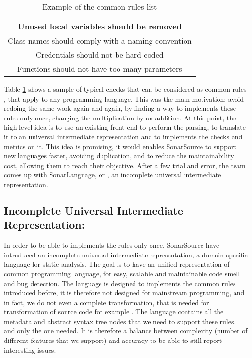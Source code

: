 \begin{table}[h]
\centering
\caption{Example of the common rules list}
\label{table:common_rules}
	\begin{tabular}{|c|}
		\hline
		Unused local variables should be removed  \\ \hline
		Class names should comply with a naming convention \\ \hline
		Credentials should not be hard-coded \\ \hline
		Functions should not have too many parameters \\ \hline
	\end{tabular}
\end{table}

Table \ref{table:common_rules} shows a sample of typical checks that can be considered as common rules \cite{JiraSonarSource:2019:Online} , that apply to any programming language.
This was the main motivation: avoid redoing the same work again and again, by finding a way to implements these rules only once, changing the multiplication by an addition.
At this point, the high level idea is to use an existing front-end to perform the parsing, to translate it to an universal intermediate representation and to implements the checks and metrics on it.
This idea is promising, it would enables SonarSource to support new languages faster, avoiding duplication, and to reduce the maintainability cost, allowing them to reach their objective.
After a few trial and error, the team comes up with SonarLanguage, or \slang{}, an incomplete universal intermediate representation. 


\subsection{Incomplete Universal Intermediate Representation: \slang{}}
\label{subsec:slang}

In order to be able to implements the rules only once, SonarSource have introduced an incomplete universal intermediate representation, a domain specific language for static analysis. 
The goal is to have an unified representation of common programming language, for easy, scalable and maintainable code smell and bug detection. 
The language is designed to implements the common rules introduced before, it is therefore not designed for mainstream programming, and in fact, we do not even a complete transformation, that is needed for transformation of source code for example \cite{Koppel:2018:OTM:3288538.3276492}.
The language contains all the metadata and abstract syntax tree nodes that we need to support these rules, and only the one needed.
It is therefore a balance between complexity (number of different features that we support) and accuracy to be able to still report interesting issues. 


